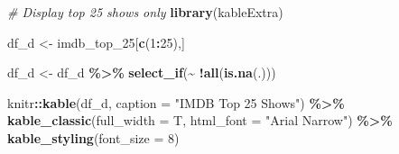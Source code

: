 \documentclass[
]{article}
\newenvironment{Shaded}{\begin{snugshade}}{\end{snugshade}}
\newcommand{\AttributeTok}[1]{\textcolor[rgb]{0.13,0.29,0.53}{#1}}
\newcommand{\CommentTok}[1]{\textcolor[rgb]{0.56,0.35,0.01}{\textit{#1}}}
\newcommand{\DecValTok}[1]{\textcolor[rgb]{0.00,0.00,0.81}{#1}}
\newcommand{\FunctionTok}[1]{\textcolor[rgb]{0.13,0.29,0.53}{\textbf{#1}}}
\newcommand{\NormalTok}[1]{#1}
\newcommand{\OtherTok}[1]{\textcolor[rgb]{0.56,0.35,0.01}{#1}}
\newcommand{\SpecialCharTok}[1]{\textcolor[rgb]{0.81,0.36,0.00}{\textbf{#1}}}
\newcommand{\StringTok}[1]{\textcolor[rgb]{0.31,0.60,0.02}{#1}}
\begin{document}
\begin{Shaded}
\begin{Highlighting}[]
\CommentTok{\# Display top 25 shows only}
\FunctionTok{library}\NormalTok{(kableExtra)}

\NormalTok{df\_d }\OtherTok{\textless{}{-}}\NormalTok{ imdb\_top\_25[}\FunctionTok{c}\NormalTok{(}\DecValTok{1}\SpecialCharTok{:}\DecValTok{25}\NormalTok{),]}

\NormalTok{df\_d }\OtherTok{\textless{}{-}}\NormalTok{ df\_d }\SpecialCharTok{\%\textgreater{}\%}
  \FunctionTok{select\_if}\NormalTok{(}\SpecialCharTok{\textasciitilde{}} \SpecialCharTok{!}\FunctionTok{all}\NormalTok{(}\FunctionTok{is.na}\NormalTok{(.)))}

\NormalTok{knitr}\SpecialCharTok{::}\FunctionTok{kable}\NormalTok{(df\_d, }\AttributeTok{caption =} \StringTok{"IMDB Top 25 Shows"}\NormalTok{) }\SpecialCharTok{\%\textgreater{}\%}
  \FunctionTok{kable\_classic}\NormalTok{(}\AttributeTok{full\_width =}\NormalTok{ T, }\AttributeTok{html\_font =} \StringTok{"Arial Narrow"}\NormalTok{) }\SpecialCharTok{\%\textgreater{}\%}
  \FunctionTok{kable\_styling}\NormalTok{(}\AttributeTok{font\_size =} \DecValTok{8}\NormalTok{)}
\end{Highlighting}
\end{Shaded}

\begingroup\fontsize{8}{10}\selectfont
\end{document}

